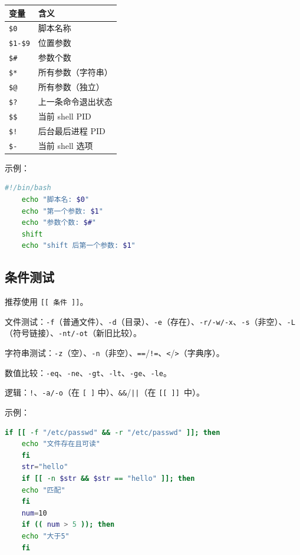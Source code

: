 \begin{center}
	\begin{tabular}{ll}
		\toprule
		变量 & 含义 \\
		\midrule
		\texttt{\$0} & 脚本名称 \\
		\texttt{\$1-\$9} & 位置参数 \\
		\texttt{\$\#} & 参数个数 \\
		\texttt{\$*} & 所有参数（字符串） \\
		\texttt{\$@} & 所有参数（独立） \\
		\texttt{\$?} & 上一条命令退出状态 \\
		\texttt{\$\$} & 当前 shell PID \\
		\texttt{\$!} & 后台最后进程 PID \\
		\texttt{\$-} & 当前 shell 选项 \\
		\bottomrule
	\end{tabular}
\end{center}


示例：
\begin{lstlisting}[language=bash]
	#!/bin/bash
	echo "脚本名: $0"
	echo "第一个参数: $1"
	echo "参数个数: $#"
	shift
	echo "shift 后第一个参数: $1"
\end{lstlisting}

\subsection{条件测试} 推荐使用 \texttt{[[ 条件 ]]}。

文件测试：\texttt{-f}（普通文件）、\texttt{-d}（目录）、\texttt{-e}（存在）、\texttt{-r/-w/-x}、\texttt{-s}（非空）、\texttt{-L}（符号链接）、\texttt{-nt/-ot}（新旧比较）。

字符串测试：\texttt{-z}（空）、\texttt{-n}（非空）、\texttt{==}/\texttt{!=}、\texttt{<}/\texttt{>}（字典序）。

数值比较：\texttt{-eq}、\texttt{-ne}、\texttt{-gt}、\texttt{-lt}、\texttt{-ge}、\texttt{-le}。

逻辑：\texttt{!}、\texttt{-a/-o}（在 \texttt{[ ]} 中）、\texttt{\&\&}/\texttt{||}（在 \texttt{[[ ]] }中）。

示例：
\begin{lstlisting}[language=bash]
	if [[ -f "/etc/passwd" && -r "/etc/passwd" ]]; then
	echo "文件存在且可读"
	fi
	str="hello"
	if [[ -n $str && $str == "hello" ]]; then
	echo "匹配"
	fi
	num=10
	if (( num > 5 )); then
	echo "大于5"
	fi
\end{lstlisting}

